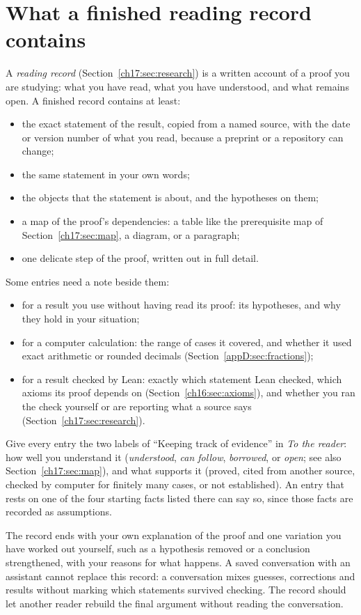 \section{What a finished reading record contains}\label{appE:sec:record}
A \emph{reading record} (Section~\ref{ch17:sec:research}) is a written account of a proof you are studying: what you have read, what you have understood, and what remains open. A finished record contains at least:
\begin{itemize}
\item the exact statement of the result, copied from a named source, with the date or version number of what you read, because a preprint or a repository can change;
\item the same statement in your own words;
\item the objects that the statement is about, and the hypotheses on them;
\item a map of the proof's dependencies: a table like the prerequisite map of Section~\ref{ch17:sec:map}, a diagram, or a paragraph;
\item one delicate step of the proof, written out in full detail.
\end{itemize}
Some entries need a note beside them:
\begin{itemize}
\item for a result you use without having read its proof: its hypotheses, and why they hold in your situation;
\item for a computer calculation: the range of cases it covered, and whether it used exact arithmetic or rounded decimals (Section~\ref{appD:sec:fractions});
\item for a result checked by Lean: exactly which statement Lean checked, which axioms its proof depends on (Section~\ref{ch16:sec:axioms}), and whether you ran the check yourself or are reporting what a source says (Section~\ref{ch17:sec:research}).
\end{itemize}

Give every entry the two labels of ``Keeping track of evidence'' in \emph{To the reader}: how well you understand it (\emph{understood}, \emph{can follow}, \emph{borrowed}, or \emph{open}; see also Section~\ref{ch17:sec:map}), and what supports it (proved, cited from another source, checked by computer for finitely many cases, or not established). An entry that rests on one of the four starting facts listed there can say so, since those facts are recorded as assumptions.

The record ends with your own explanation of the proof and one variation you have worked out yourself, such as a hypothesis removed or a conclusion strengthened, with your reasons for what happens. A saved conversation with an assistant cannot replace this record: a conversation mixes guesses, corrections and results without marking which statements survived checking. The record should let another reader rebuild the final argument without reading the conversation.
